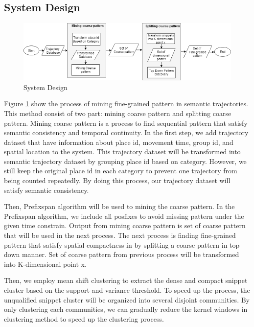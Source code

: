 \documentclass[a4paper,oneside]{article}
\begin{document}
		 \subsection{System Design}
		 	\begin{figure}[!ht]
		 	\centering
		 	\includegraphics[width=1\linewidth]{splitter}
		 	\caption{System Design}
		 	\label{fig:systemdesign}
		 \end{figure}
		 Figure \ref{fig:systemdesign} show the process of mining fine-grained pattern in semantic trajectories. This method consist of two part: mining coarse pattern and splitting coarse pattern. Mining coarse pattern is a process to find sequential pattern that satisfy semantic consistency and temporal continuity. In the first step, we add trajectory dataset that have information about place id, movement time, group id, and spatial location to the system. This trajectory dataset will be transformed into semantic trajectory dataset by grouping place id based on category. However, we still keep the original place id in each category to prevent one trajectory from being counted repeatedly. By doing this process, our trajectory dataset will satisfy semantic consistency.
		 
		 Then, Prefixspan algorithm will be used to mining the coarse pattern. In the Prefixspan algorithm, we include all posfixes to avoid missing pattern under the given time constrain. Output from mining coarse pattern is set of coarse pattern that will be used in the next process. The next process is finding fine-grained pattern that satisfy spatial compactness in by splitting a coarse pattern in top down manner. Set of coarse pattern from previous process will be transformed into K-dimensional point x.
		 
		 Then, we employ mean shift clustering to extract the dense and compact snippet cluster based on the support and variance threshold. To speed up the process, the unqualified snippet cluster will be organized into several disjoint communities. By only clustering each communities, we can gradually reduce the kernel windows in clustering method to speed up the clustering process.
		
\end{document}
